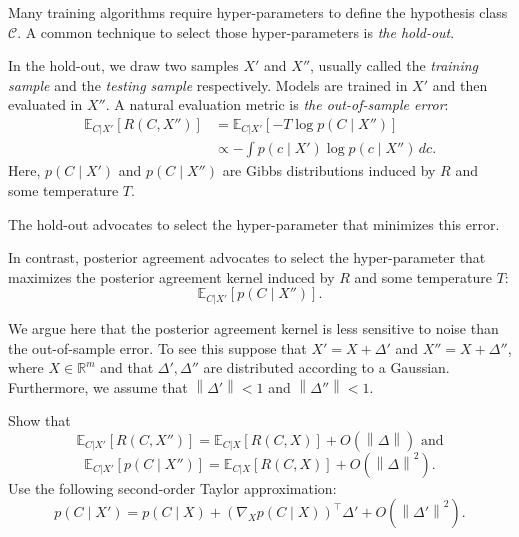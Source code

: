 Many training algorithms require hyper-parameters to define the hypothesis class $\mathcal{C}$. A common technique to select those hyper-parameters is \emph{the hold-out}. 

In the hold-out, we draw two samples $X'$ and $X''$, usually called the \emph{training sample} and the \emph{testing sample} respectively. Models are trained in $X'$ and then evaluated in $X''$. A natural evaluation metric is \emph{the out-of-sample error}:
%
\begin{align}
\mathbb{E}_{C | X'}\left[R(C, X'')\right] &= \mathbb{E}_{C | X'}\left[- T \log p(C \mid X'')\right]\\ 
&\propto - \int p(c \mid X') \log p(c \mid X'') \, dc.
\end{align}
%
Here, $p(C \mid X')$ and $p(C \mid X'')$ are Gibbs distributions induced by $R$ and some temperature $T$.

The hold-out advocates to select the hyper-parameter that minimizes this error.

In contrast, posterior agreement advocates to select the hyper-parameter that maximizes the posterior agreement kernel induced by $R$ and some temperature $T$:
%
\begin{equation}
\mathbb{E}_{C | X'}\left[p(C \mid X'')\right].
\end{equation}

We argue here that the posterior agreement kernel is less sensitive to noise than the out-of-sample error. To see this suppose that $X' = X + \Delta'$ and $X'' = X + \Delta''$, where $X \in \mathbb{R}^m$ and that $\Delta', \Delta''$ are distributed according to a Gaussian. Furthermore, we assume that $\left\|\Delta'\right\| < 1$ and $\left\|\Delta''\right\| < 1$. 

\begin{exercise} Show that
%
\begin{equation}
\mathbb{E}_{C | X'}[R(C, X'')] = \mathbb{E}_{C | X}[R(C, X)] + O(\left\|\Delta\right\|) \text{ and}
\end{equation}
%
\begin{equation}
\mathbb{E}_{C | X'}[p(C \mid X'')] = \mathbb{E}_{C | X}[R(C, X)] + O(\left\|\Delta\right\|^2).
\end{equation}
%
Use the following second-order Taylor approximation:
%
\begin{equation}
p(C \mid X') = p(C \mid X) + \left(\nabla_{X}p(C\mid X)\right)^\top \Delta' + O(\left\|\Delta'\right\|^2).
\end{equation}
%
\end{exercise}
%


